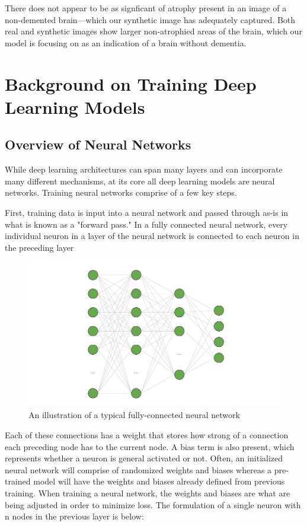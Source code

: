 \documentclass [MAS] {uclathes}
\begin{document}
There does not appear to be as signficant of atrophy present in an image of a non-demented brain---which our synthetic 
image has adequately captured. Both real and synthetic images show larger non-atrophied areas of the brain, which our 
model is focusing on as an indication of a brain without dementia.

\chapter{Background on Training Deep Learning Models}

\section{Overview of Neural Networks}
While deep learning architectures can span many layers and can incorporate many different mechanisms, at its core all 
deep learning models are neural networks. Training neural networks comprise of a few key steps. 

First, training data is input into a neural network and passed through as-is in what is known as a "forward pass." In a 
fully connected neural network, every individual neuron in a layer of the neural network is connected to each neuron in 
the preceding layer 

\begin{figure}[H]
    \centering
    \includegraphics[width=0.75\linewidth]{figures/NN_diagram.jpg}
    \caption{An illustration of a  typical fully-connected neural network}
    \label{fig:enter-label}
\end{figure}

Each of these connections has a weight that stores how strong of a connection each preceding node has to the current 
node. A bias term is also present, which represents whether a neuron is general activated or not. Often, an initialized 
neural network will comprise of randomized weights and biases whereas a pre-trained model will have the weights and 
biases already defined from previous training. When training a neural network, the weights and biases are what are being 
adjusted in order to minimize loss. The formulation of a single neuron with n nodes in the previous layer is below:
\end{document}
